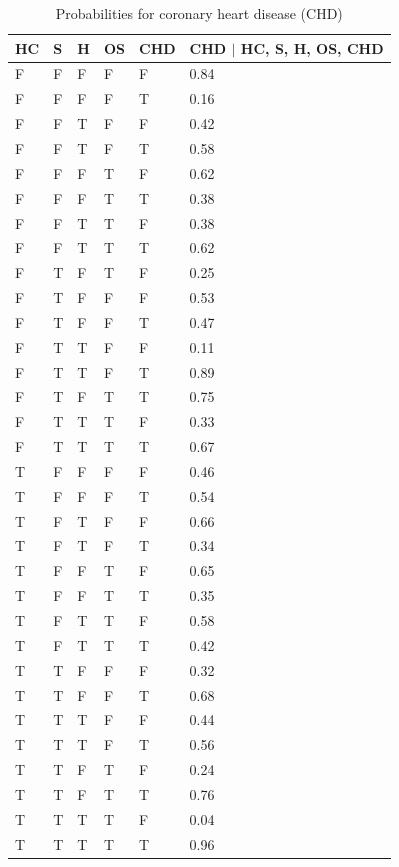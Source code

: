 \begin{table}
\centering
\caption{Probabilities for coronary heart disease (CHD)}\label{tab1}
\begin{tabular}{p{1.2cm} p{1.2cm} p{1.2cm} p{1.2cm} p{1.2cm} p{2cm} }
\hline
HC & S & H & OS & CHD & CHD $\mid$ HC, S, H, OS, CHD\\
\hline
F &	F &	F &	F &	F &	0.84\\
F &	F &	F &	F &	T &	0.16\\
F &	F &	T &	F &	F &	0.42\\
F &	F &	T &	F &	T &	0.58\\
F &	F &	F &	T &	F &	0.62\\
F &	F &	F &	T &	T &	0.38\\
F &	F &	T &	T &	F &	0.38\\
F &	F &	T &	T &	T &	0.62\\
F &	T &	F &	T & 	F &	0.25\\
F &	T &	F &	F &	F &	0.53\\
F &	T &	F &	F &	T &	0.47\\
F &	T &	T &	F &	F &	0.11\\
F &	T &	T &	F &	T &	0.89\\
F &	T &	F &	T &	T &	0.75\\
F &	T &	T &	T &	F &	0.33\\
F &	T &	T &	T &	T &	0.67\\
T &	F &	F &	F &	F &	0.46\\
T &	F &	F &	F &	T &	0.54\\
T &	F &	T &	F &	F &	0.66\\
T &	F &	T &	F &	T &	0.34\\
T &	F &	F &	T &	F &	0.65\\
T &	F &	F &	T &	T &	0.35\\
T &	F &	T &	T & F &	0.58\\
T &	F &	T &	T &	T &	0.42\\
T &	T &	F & F &	F &	0.32\\
T &	T &	F &	F &	T &	0.68\\
T &	T &	T &	F &	F &	0.44\\
T &	T &	T &  F &	T &	0.56\\
T &	T &	F &	T &	F &	0.24\\
T &	T &	F & T &	T &	0.76\\
T &	T &  T &	T &	F &	0.04\\
T &	T &	T &	T &	T &	0.96\\
\hline
\end{tabular}
\end{table}